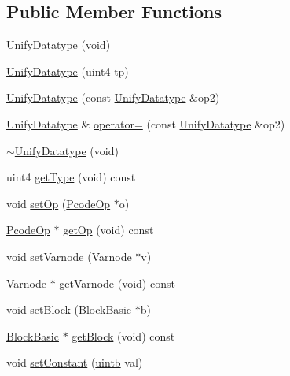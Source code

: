 \subsection*{Public Member Functions}
\begin{DoxyCompactItemize}
\item 
\mbox{\hyperlink{class_unify_datatype_a74bc8d454c4b395e69435e2a96d2f471}{Unify\+Datatype}} (void)
\item 
\mbox{\hyperlink{class_unify_datatype_ae254d396339b3e2066292620c061e86c}{Unify\+Datatype}} (uint4 tp)
\item 
\mbox{\hyperlink{class_unify_datatype_ae0c244b41606f4729901e4dd82335bc5}{Unify\+Datatype}} (const \mbox{\hyperlink{class_unify_datatype}{Unify\+Datatype}} \&op2)
\item 
\mbox{\hyperlink{class_unify_datatype}{Unify\+Datatype}} \& \mbox{\hyperlink{class_unify_datatype_afd49e76e9b3f64d1530793f62cb589cb}{operator=}} (const \mbox{\hyperlink{class_unify_datatype}{Unify\+Datatype}} \&op2)
\item 
\mbox{\hyperlink{class_unify_datatype_abe7f79c3d4c417d205212b4c807d9b4c}{$\sim$\+Unify\+Datatype}} (void)
\item 
uint4 \mbox{\hyperlink{class_unify_datatype_a43799672b1fb3a66ecef454317fb749b}{get\+Type}} (void) const
\item 
void \mbox{\hyperlink{class_unify_datatype_afbd601c993359824de600c55786400b0}{set\+Op}} (\mbox{\hyperlink{class_pcode_op}{Pcode\+Op}} $\ast$o)
\item 
\mbox{\hyperlink{class_pcode_op}{Pcode\+Op}} $\ast$ \mbox{\hyperlink{class_unify_datatype_acd27c8c5ffc92a6a16f5eb195b505331}{get\+Op}} (void) const
\item 
void \mbox{\hyperlink{class_unify_datatype_ad1117ec3dacabf1261b6d4a86f13df88}{set\+Varnode}} (\mbox{\hyperlink{class_varnode}{Varnode}} $\ast$v)
\item 
\mbox{\hyperlink{class_varnode}{Varnode}} $\ast$ \mbox{\hyperlink{class_unify_datatype_af78efe768ec26396bdadaea45ed61b23}{get\+Varnode}} (void) const
\item 
void \mbox{\hyperlink{class_unify_datatype_a17b622d8a3d3c1d6f52fdc714dff8a73}{set\+Block}} (\mbox{\hyperlink{class_block_basic}{Block\+Basic}} $\ast$b)
\item 
\mbox{\hyperlink{class_block_basic}{Block\+Basic}} $\ast$ \mbox{\hyperlink{class_unify_datatype_a91c838e12c5d01f8d02637c9087aeb5a}{get\+Block}} (void) const
\item 
void \mbox{\hyperlink{class_unify_datatype_a469e388d9f4f2b04125bb5926420c7c9}{set\+Constant}} (\mbox{\hyperlink{types_8h_a2db313c5d32a12b01d26ac9b3bca178f}{uintb}} val)

\end{DoxyCompactItemize}
